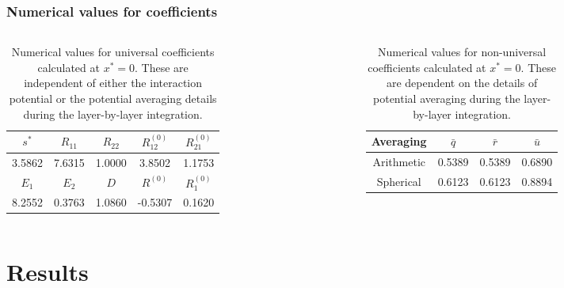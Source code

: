 \documentclass[8pt]{beamer}
\begin{document}
	\begin{frame}
		\frametitle{Numerical values for coefficients}
		
		\begin{columns}
			\begin{column}{0.5\textwidth}
				\begin{table}[h]
					\noindent\caption{Numerical values for universal coefficients calculated at $x^* = 0$. These are independent of either the interaction potential or the potential averaging details during the layer-by-layer integration.}\vskip3mm
					\begin{tabular}{|c|c|c|c|c|}
						\hline
						$s^*$ & $R_{11}$ \quad & $R_{22}$ & $R_{12}^{(0)}$  & $R_{21}^{(0)}$\\
						\hline
						3.5862 & 7.6315  & 1.0000 & 3.8502 & 1.1753 \\
						\hline
						\hline
						$E_1$ & $E_2$ \quad & $D$ & $R^{(0)}$  & $R_1^{(0)}$\\
						\hline
						8.2552 & 0.3763  & 1.0860 & -0.5307 & 0.1620 \\
						\hline
					\end{tabular}
					\label{tab:num_coef}
				\end{table}
			\end{column}
			
			\begin{column}{0.5\textwidth}
				\begin{table}[h]
					\noindent\caption{Numerical values for non-universal coefficients calculated at $x^* = 0$. These are dependent on the details of potential averaging during the layer-by-layer integration.}\vskip3mm
					\begin{tabular}{|c|c|c|c|}
						\hline
						Averaging & $\bar{q}$ \quad & $\bar{r}$ & $\bar{u}$ \\
						\hline
						Arithmetic & 0.5389  & 0.5389 & 0.6890 \\
						Spherical & 0.6123 & 0.6123 & 0.8894 \\
						\hline
					\end{tabular}
					\label{tab:num_coef_vs_average}
				\end{table}
			\end{column}
		
		\end{columns}
	\end{frame}
	
	\section{Results}
	
\end{document}
